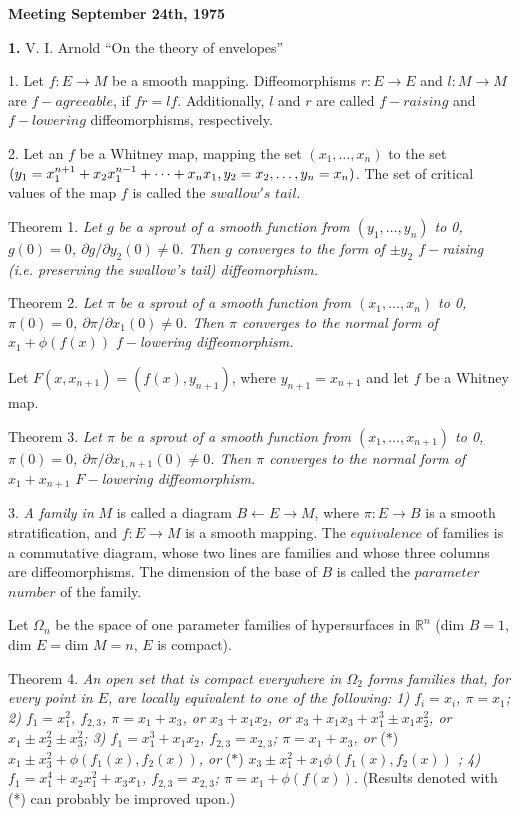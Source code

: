 \documentclass{article}
\begin{document}
\large\noindent\textbf{Meeting September 24th, 1975}

\textbf{1.} V. I. Arnold ``On the theory of envelopes''

\normalsize1\degree.
Let $f:E\to M$ be a smooth mapping.
Diffeomorphisms $r:E\to E$ and $l:M\to M$ are $f-agreeable$, if $fr=lf$.
Additionally, $l$ and $r$ are called $f-raising$ and $f-lowering$
diffeomorphisms, respectively.

2\degree.
Let an $f$ be a Whitney map, mapping the set
$(x_1,\dots,x_n)$ to the set$(\smash{y_1=x_1^{n+1}+x_2x_1^{n-1}+\dots+x_nx_1},
y_2=x_2,\dots,y_n=x_n)$.
The set of critical values of the map $f$ is called the $swallow's$ $tail$.

Theorem 1.
\textit{Let $g$ be a sprout of a smooth function from
$(y_1,\dots,y_n)$ to 0, $g(0)=0$, $\partial g/\partial y_2(0)\neq0$.
Then $g$ converges to the form of $\pm y_2$ $f-$raising (i.e. preserving the
swallow's tail) diffeomorphism.}

Theorem 2.
\textit{Let $\pi$ be a sprout of a smooth function from
$(x_1,\dots,x_n)$ to 0, $\pi(0)=0$, $\partial\pi/\partial x_1(0)\neq0$.
Then $\pi$ converges to the normal form of $x_1+\phi(f(x))$ $f-$lowering
diffeomorphism.}

Let $F(x,x_{n+1})=(f(x),y_{n+1})$, where $y_{n+1}=x_{n+1}$ and let $f$ be a
Whitney map.

Theorem 3.
\textit{Let $\pi$ be a sprout of a smooth function from
$(x_1,\dots,x_{n+1})$ to 0, $\pi(0)=0$,
$\partial\pi/\partial x_{1,n+1}(0)\neq0$.
Then $\pi$ converges to the normal form of $x_1+x_{n+1}$ $F-$lowering
diffeomorphism.}

3\degree.
\textit{A family in} $M$ is called a diagram $B\leftarrow E\to M$, where
$\pi:E\to B$ is a smooth stratification, and $f:E\to M$ is a smooth mapping.
The $equivalence$ of families is a commutative diagram, whose two lines are
families and whose three columns are diffeomorphisms.
The dimension of the base of $B$ is called the $parameter$ $number$ of the
family.

Let $\Omega_n$ be the space of one parameter families of hypersurfaces in
$\mathbb{R}^n$ (dim $B=1$, dim $E=$dim $M=n$, $E$ is compact).

Theorem 4.
\textit{An open set that is compact everywhere in $\Omega_2$ forms families
that, for every point in $E$, are locally equivalent to one of the following:
1) $f_i=x_i$, $\pi=x_1$; 2) $f_1=x_1^2$, $f_{2,3}$, $\pi=x_1+x_3$, or
$x_3+x_1x_2$, or $x_3+x_1x_3+x_1^3\pm x_1x_2^2$, or $x_1\pm x_2^2\pm x_3^2$;
3) $f_1=x_1^3+x_1x_2$, $f_{2,3}=x_{2,3}$; $\pi=x_1+x_3$, or }($\ast$)\textit{
$x_1\pm x_3^2+\phi(f_1(x),f_2(x))$, or }($\ast$)\textit{ $x_3\pm x_1^2+x_1\phi(f_1(x),f_2(x))$
; 4) $f_1=x_1^4+x_2x_1^2+x_3x_1$, $f_{2,3}=x_{2,3}$; $\pi=x_1+\phi(f(x))$.}
(Results denoted with (*) can probably be improved upon.)
\end{document}
